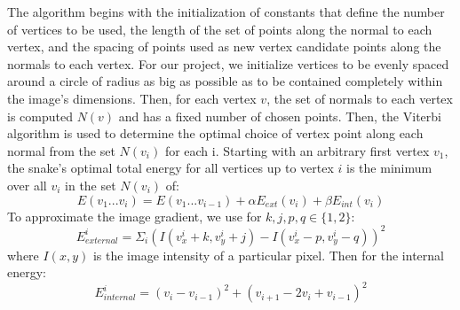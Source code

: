 \documentclass[twoside]{article}
\begin{document}
\begin{multicols}{2}
The algorithm begins with the initialization of constants that define the number of vertices to be used, the length of the set of points along the normal to each vertex, and the spacing of points used as new vertex candidate points along the normals to each vertex. For our project, we initialize vertices to be evenly spaced around a circle of radius as big as possible as to be contained completely within the image's dimensions. Then, for each vertex $v$, the set of normals to each vertex is computed $N(v)$ and has a fixed number of chosen points. Then, the Viterbi algorithm is used to determine the optimal choice of vertex point along each normal from the set $N(v_i)$ for each i. Starting with an arbitrary first vertex $v_1$, the snake's optimal total energy for all vertices up to vertex $i$ is the minimum over all $v_i$ in the set $N(v_i)$ of:
\begin{equation}
E(v_1...v_i) = E(v_1...v_{i-1}) + \alpha E_{ext}(v_i) + \beta E_{int}(v_i)
\end{equation}
To approximate the image gradient, we use for $k,j,p,q \in \{1,2\} $:
\begin{equation}
E^{i}_{external} = \Sigma_i (I(v^{i}_x+k,v^{i}_y+j) - I(v^{i}_x-p,v^{i}_y-q))^2 
\end{equation}
where $I(x,y)$ is the image intensity of a particular pixel.
Then for the internal energy: 
\begin{equation}
E^{i}_{internal} = (v_i - v_{i-1})^2 + (v_{i+1} - 2v_i + v_{i-1})^2 
\end{equation}


\end{multicols}
\end{document}
